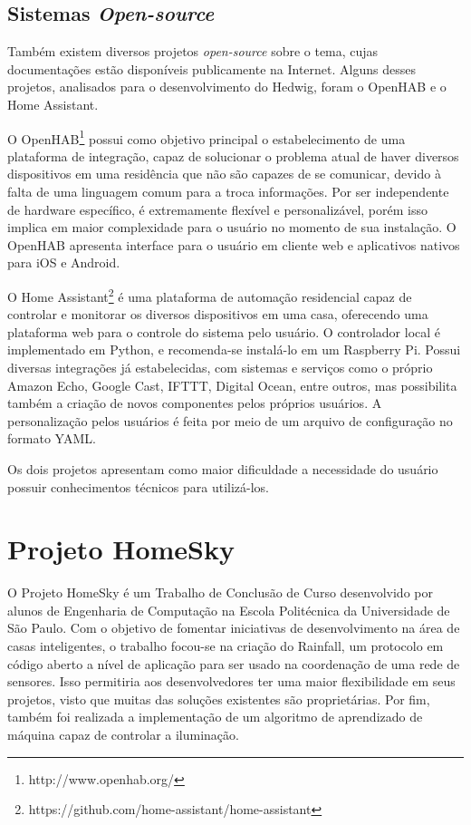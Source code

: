 \subsection{Sistemas \emph{Open-source}}
Também existem diversos projetos \emph{open-source} sobre o tema, cujas documentações estão disponíveis publicamente na Internet. Alguns desses projetos, analisados para o desenvolvimento do Hedwig, foram o OpenHAB e o Home Assistant.

O OpenHAB\footnote{http://www.openhab.org/} possui como objetivo principal o estabelecimento de uma plataforma de integração, capaz de solucionar o problema atual de haver diversos dispositivos em uma residência que não são capazes de se comunicar, devido à falta de uma linguagem comum para a troca informações. Por ser independente de hardware específico, é extremamente flexível e personalizável, porém isso implica em maior complexidade para o usuário no momento de sua instalação. O OpenHAB apresenta interface para o usuário em cliente web e aplicativos nativos para iOS e Android.

O Home Assistant\footnote{https://github.com/home-assistant/home-assistant} é uma plataforma de automação residencial capaz de controlar e monitorar os diversos dispositivos em uma casa, oferecendo uma plataforma web para o controle do sistema pelo usuário. O controlador local é implementado em Python, e recomenda-se instalá-lo em um Raspberry Pi. Possui diversas integrações já estabelecidas, com sistemas e serviços como o próprio Amazon Echo, Google Cast, IFTTT, Digital Ocean, entre outros, mas possibilita também a criação de novos componentes pelos próprios usuários. A personalização pelos usuários é feita por meio de um arquivo de configuração no formato YAML.

Os dois projetos apresentam como maior dificuldade a necessidade do usuário possuir conhecimentos técnicos para utilizá-los.

\section{Projeto HomeSky}

O Projeto HomeSky \cite{homeSky} é um Trabalho de Conclusão de Curso desenvolvido por alunos de Engenharia de Computação na Escola Politécnica da Universidade de São Paulo. Com o objetivo de fomentar iniciativas de desenvolvimento na área de casas inteligentes, o trabalho focou-se na criação do Rainfall, um protocolo em código aberto a nível de aplicação para ser usado na coordenação de uma rede de sensores. Isso permitiria aos desenvolvedores ter uma maior flexibilidade em seus projetos, visto que muitas das soluções existentes são proprietárias. Por fim, também foi realizada a implementação de um algoritmo de aprendizado de máquina capaz de controlar a iluminação.

